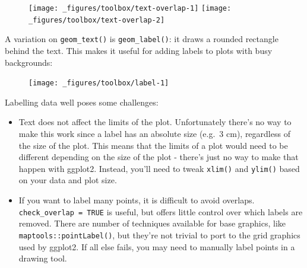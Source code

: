 \begin{itemize}
  \begin{figure}[H]
    \texttt{[image: \_figures/toolbox/text-overlap-1]}%
    \texttt{[image: \_figures/toolbox/text-overlap-2]}
  \end{figure}
\end{itemize}

A variation on \texttt{geom\_text()} is \texttt{geom\_label()}: it draws
a rounded rectangle behind the text. This makes it useful for adding
labels to plots with busy backgrounds: 

\begin{Shaded}
\begin{Highlighting}[]
\StringTok{ }\NormalTok{(}
   \NormalTok{(}\NormalTok{, }\NormalTok{), }
   \NormalTok{(}\NormalTok{, }\NormalTok{), }
   \NormalTok{(}\NormalTok{, }\NormalTok{)}
\NormalTok{)}

\StringTok{  }\NormalTok{(}\NormalTok{(} \StringTok{ }
\StringTok{  }\NormalTok{(} \NormalTok{(} 
\end{Highlighting}
\end{Shaded}

\begin{figure}[H]
  \centering
  \texttt{[image: \_figures/toolbox/label-1]}
\end{figure}

Labelling data well poses some challenges:

\begin{itemize}
\item
  Text does not affect the limits of the plot. Unfortunately there's no
  way to make this work since a label has an absolute size (e.g.~3 cm),
  regardless of the size of the plot. This means that the limits of a
  plot would need to be different depending on the size of the plot -
  there's just no way to make that happen with ggplot2. Instead, you'll
  need to tweak \texttt{xlim()} and \texttt{ylim()} based on your data
  and plot size.
\item
  If you want to label many points, it is difficult to avoid overlaps.
  \texttt{check\_overlap\ =\ TRUE} is useful, but offers little control
  over which labels are removed. There are number of techniques
  available for base graphics, like \texttt{maptools::pointLabel()}, but
  they're not trivial to port to the grid graphics used by ggplot2. If
  all else fails, you may need to manually label points in a drawing
  tool.
\end{itemize}

